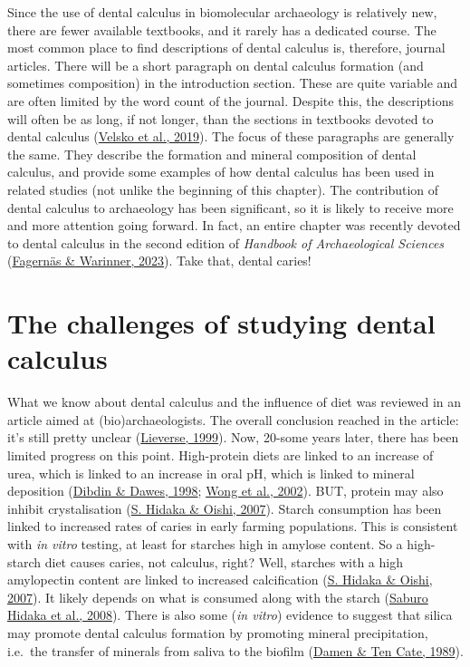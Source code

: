 \documentclass[
  letterpaper,
]{book}
\begin{document}
Since the use of dental calculus in biomolecular archaeology is
relatively new, there are fewer available textbooks, and it rarely has a
dedicated course. The most common place to find descriptions of dental
calculus is, therefore, journal articles. There will be a short
paragraph on dental calculus formation (and sometimes composition) in
the introduction section. These are quite variable and are often limited
by the word count of the journal. Despite this, the descriptions will
often be as long, if not longer, than the sections in textbooks devoted
to dental calculus
(\protect\hyperlink{ref-velskoMicrobialDifferences2019}{Velsko et al.,
2019}). The focus of these paragraphs are generally the same. They
describe the formation and mineral composition of dental calculus, and
provide some examples of how dental calculus has been used in related
studies (not unlike the beginning of this chapter). The contribution of
dental calculus to archaeology has been significant, so it is likely to
receive more and more attention going forward. In fact, an entire
chapter was recently devoted to dental calculus in the second edition of
\emph{Handbook of Archaeological Sciences}
(\protect\hyperlink{ref-fagernasDentalCalculus2023}{Fagernäs \&
Warinner, 2023}). Take that, dental caries!

\hypertarget{the-challenges-of-studying-dental-calculus}{%
\section{The challenges of studying dental
calculus}\label{the-challenges-of-studying-dental-calculus}}

What we know about dental calculus and the influence of diet was
reviewed in an article aimed at (bio)archaeologists. The overall
conclusion reached in the article: it's still pretty unclear
(\protect\hyperlink{ref-lieverseDietAetiology1999}{Lieverse, 1999}).
Now, 20-some years later, there has been limited progress on this point.
High-protein diets are linked to an increase of urea, which is linked to
an increase in oral pH, which is linked to mineral deposition
(\protect\hyperlink{ref-dibdinOralUrea1998}{Dibdin \& Dawes, 1998};
\protect\hyperlink{ref-wongCalciumPhosphate2002}{Wong et al., 2002}).
BUT, protein may also inhibit crystalisation
(\protect\hyperlink{ref-hidakaDietCalculus2007}{S. Hidaka \& Oishi,
2007}). Starch consumption has been linked to increased rates of caries
in early farming populations. This is consistent with \emph{in vitro}
testing, at least for starches high in amylose content. So a high-starch
diet causes caries, not calculus, right? Well, starches with a high
amylopectin content are linked to increased calcification
(\protect\hyperlink{ref-hidakaDietCalculus2007}{S. Hidaka \& Oishi,
2007}). It likely depends on what is consumed along with the starch
(\protect\hyperlink{ref-hidakaStarchRole2008}{Saburo Hidaka et al.,
2008}). There is also some (\emph{in vitro}) evidence to suggest that
silica may promote dental calculus formation by promoting mineral
precipitation, i.e.~the transfer of minerals from saliva to the biofilm
(\protect\hyperlink{ref-damenSilicicAcid1989}{Damen \& Ten Cate, 1989}).
\end{document}
